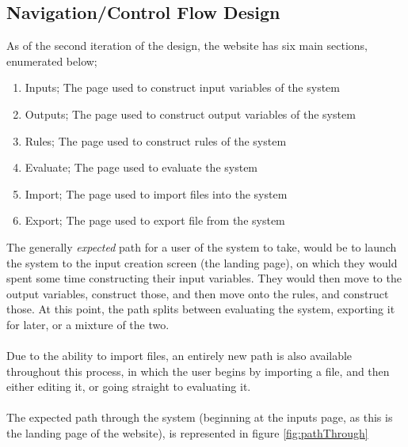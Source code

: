 \subsection{Navigation/Control Flow Design}	
\label{subsec:nav}	
As of the second iteration of the design, the website has six main sections, enumerated below;
\begin{enumerate}
\item Inputs;
The page used to construct input variables of the system
\item Outputs;
The page used to construct output variables of the system
\item Rules;
The page used to construct rules of the system
\item Evaluate;
The page used to evaluate the system
\item Import;
The page used to import files into the system
\item Export;
The page used to export file from the system
\end{enumerate}
\noindent 
The generally \emph{expected} path for a user of the system to take, would be to launch the system to the input creation screen (the landing page), on which they would spent some time constructing their input variables. They would then move to the output variables, construct those, and then move onto the rules, and construct those. At this point, the path splits between evaluating the system, exporting it for later, or a mixture of the two. \ \\
\ \\
Due to the ability to import files, an entirely new path is also available throughout this process, in which the user begins by importing a file, and then either editing it, or going straight to evaluating it.\ \\
\ \\
The expected path through the system (beginning at the inputs page, as this is the landing page of the website), is represented in figure \ref{fig:pathThrough}

